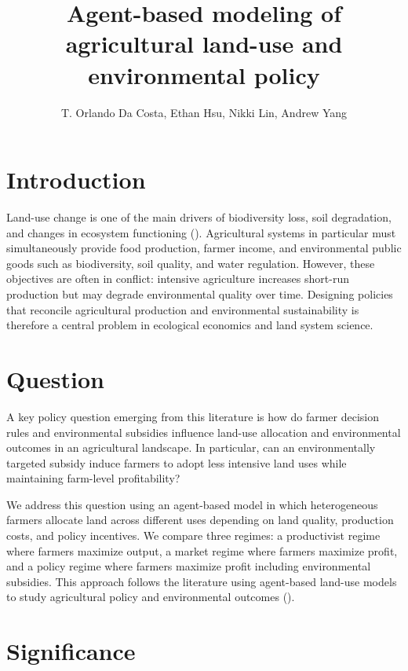 \documentclass{article}
\title{Agent-based modeling of agricultural land-use and environmental policy}
\author{T. Orlando Da Costa, Ethan Hsu, Nikki Lin, Andrew Yang}
\begin{document}
\maketitle

\section*{Introduction}

Land-use change is one of the main drivers of biodiversity loss, soil degradation, and changes in ecosystem functioning (\cite{yin2020soil}). Agricultural systems in particular must simultaneously provide food production, farmer income, and environmental public goods such as biodiversity, soil quality, and water regulation. However, these objectives are often in conflict: intensive agriculture increases short-run production but may degrade environmental quality over time. Designing policies that reconcile agricultural production and environmental sustainability is therefore a central problem in ecological economics and land system science.

\section*{Question}

A key policy question emerging from this literature is how do farmer decision rules and environmental subsidies influence land-use allocation and environmental outcomes in an agricultural landscape. In particular, can an environmentally targeted subsidy induce farmers to adopt less intensive land uses while maintaining farm-level profitability?

We address this question using an agent-based model in which heterogeneous farmers allocate land across different uses depending on land quality, production costs, and policy incentives. We compare three regimes: a productivist regime where farmers maximize output, a market regime where farmers maximize profit, and a policy regime where farmers maximize profit including environmental subsidies. This approach follows the literature using agent-based land-use models to study agricultural policy and environmental outcomes (\cite{matthews2007abm, dai2020landsystem, baldi2025cap}).

\section*{Significance}
\end{document}
